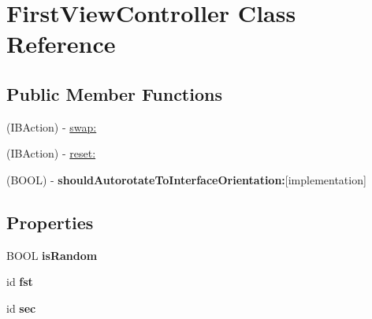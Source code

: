 \hypertarget{interface_first_view_controller}{\section{First\-View\-Controller Class Reference}
\label{interface_first_view_controller}
}
\subsection*{Public Member Functions}
\begin{DoxyCompactItemize}
\item 
(I\-B\-Action) -\/ \hyperlink{interface_first_view_controller_ac1f53a85b4b98432cc29b24af8b4b145}{swap\-:}
\item 
(I\-B\-Action) -\/ \hyperlink{interface_first_view_controller_a38d4d1801d0cb71738814758be305763}{reset\-:}
\item 
\hypertarget{interface_first_view_controller_a96845aa9ccf2295e9e4b1168b1c777c2}{(B\-O\-O\-L) -\/ {\bfseries should\-Autorotate\-To\-Interface\-Orientation\-:}{\ttfamily  \mbox{[}implementation\mbox{]}}}\label{interface_first_view_controller_a96845aa9ccf2295e9e4b1168b1c777c2}

\end{DoxyCompactItemize}
\subsection*{Properties}
\begin{DoxyCompactItemize}
\item 
\hypertarget{interface_first_view_controller_a397a57200918e0c0d98113701755a766}{B\-O\-O\-L {\bfseries is\-Random}}\label{interface_first_view_controller_a397a57200918e0c0d98113701755a766}

\item 
\hypertarget{interface_first_view_controller_a640a03f557a6e41f0fca703aaec39c87}{id {\bfseries fst}}\label{interface_first_view_controller_a640a03f557a6e41f0fca703aaec39c87}

\item 
\hypertarget{interface_first_view_controller_a248aa0b01451e8082be49fbf72b3dac0}{id {\bfseries sec}}\label{interface_first_view_controller_a248aa0b01451e8082be49fbf72b3dac0}

\end{DoxyCompactItemize}


